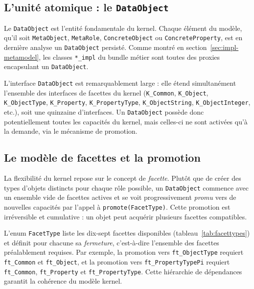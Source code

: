 \subsection{L'unité atomique : le \texttt{DataObject}}

Le \texttt{DataObject} est l'entité fondamentale du kernel. Chaque
élément du modèle, qu'il soit \texttt{MetaObject}, \texttt{MetaRole},
\texttt{ConcreteObject} ou \texttt{ConcreteProperty}, est en dernière analyse un \texttt{DataObject} persisté. Comme montré en
section~\ref{sec:impl-metamodel}, les classes \texttt{*\_impl} du bundle
métier sont toutes des proxies encapsulant un \texttt{DataObject}.

L'interface \texttt{DataObject} est remarquablement large : elle étend
simultanément l'ensemble des interfaces de facettes du kernel
(\texttt{K\_Common}, \texttt{K\_Object}, \texttt{K\_ObjectType},
\texttt{K\_Property}, \texttt{K\_PropertyType}, \texttt{K\_ObjectString},
\texttt{K\_ObjectInteger}, etc.), soit une quinzaine d'interfaces. Un
\texttt{DataObject} possède donc potentiellement toutes les capacités du
kernel, mais celles-ci ne sont activées qu'à la demande, via le mécanisme
de promotion.

\subsection{Le modèle de facettes et la promotion}

La flexibilité du kernel repose sur le concept de \emph{facette}. Plutôt
que de créer des types d'objets distincts pour chaque rôle possible, un
\texttt{DataObject} commence avec un ensemble vide de facettes actives et
se voit progressivement \emph{promu} vers de nouvelles capacités par
l'appel à \texttt{promote(FacetType)}. Cette promotion est irréversible
et cumulative : un objet peut acquérir plusieurs facettes compatibles.

L'enum \texttt{FacetType} liste les dix-sept facettes disponibles
(tableau~\ref{tab:facettypes}) et définit pour chacune sa
\emph{fermeture}, c'est-à-dire l'ensemble des facettes préalablement
requises. Par exemple, la promotion vers
\texttt{ft\_ObjectType} requiert \texttt{ft\_Common} et \texttt{ft\_Object},
et la promotion vers \texttt{ft\_PropertyTypePi} requiert \texttt{ft\_Common},
\texttt{ft\_Property} et \texttt{ft\_PropertyType}. Cette hiérarchie de
dépendances garantit la cohérence du modèle kernel.

